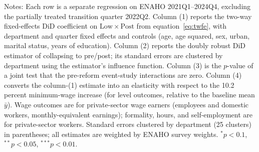 \begin{table}[!tbp]
\begin{threeparttable}
\begin{tabular}{lcccc}
\bottomrule
\end{tabular}
\begin{tablenotes}\footnotesize
\item Notes: Each row is a separate regression on ENAHO 2021Q1--2024Q4, excluding the partially treated transition quarter 2022Q2. Column (1) reports the two-way fixed-effects DiD coefficient on $\mathrm{Low}\times\mathrm{Post}$ from equation~\eqref{eq:twfe}, with department and quarter fixed effects and controls (age, age squared, sex, urban, marital status, years of education). Column (2) reports the doubly robust DiD estimator of \citet{santanna_zhao_2020} collapsing to pre/post; its standard errors are clustered by department using the estimator's influence function. Column (3) is the $p$-value of a joint test that the pre-reform event-study interactions are zero. Column (4) converts the column-(1) estimate into an elasticity with respect to the 10.2 percent minimum-wage increase (for level outcomes, relative to the baseline mean $\bar{y}$). Wage outcomes are for private-sector wage earners (employees and domestic workers, monthly-equivalent earnings); formality, hours, and self-employment are for private-sector workers. Standard errors clustered by department (25 clusters) in parentheses; all estimates are weighted by ENAHO survey weights. $^{*}p<0.1$, $^{**}p<0.05$, $^{***}p<0.01$.
\end{tablenotes}
\end{threeparttable}\end{table}
